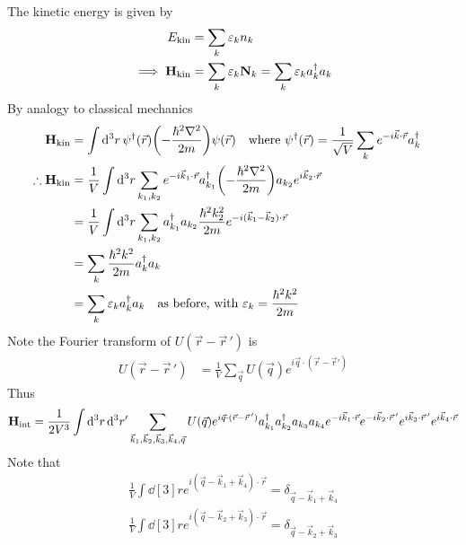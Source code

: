 \documentclass[12pt,a4paper,titlepage]{article}
\newcommand{\trm}[1]{\textrm{#1}} %
\begin{document}
The kinetic energy is given by
\begin{equation}
\begin{aligned}
E_{\trm{kin}}&=\sum_{k}\varepsilon_{k}n_{k}\\
\implies \vb{H}_{\trm{kin}}&=\sum_{k}\varepsilon_{k}\vb{N}_{k}=\sum_{k}\varepsilon_{k}a_{k}^{\dagger}a_{k}
\end{aligned}
\end{equation}
By analogy to classical mechanics
\begin{equation}
\begin{aligned}
\vb{H}_{\trm{kin}}&=\int\dd[3]{r}\psi^{\dagger}(\vec{r})\qty(-\frac{\hbar^{2}\nabla^{2}}{2m})\psi(\vec{r})\qq{where $\psi^{\dagger}(\vec{r})=\frac{1}{\sqrt{V}}\sum_{k}e^{-i\vec{k}\cdot\vec{r}}a_{k}^{\dagger}$}\\
\therefore \vb{H}_{\trm{kin}}&=\frac{1}{V}\int\dd[3]{r}\sum_{k_{1},k_{2}}e^{-i\vec{k}_{1}\cdot\vec{r}}a_{k_{1}}^{\dagger}\qty(-\frac{\hbar^{2}\nabla^{2}}{2m})a_{k_{2}}e^{i\vec{k}_{2}\cdot\vec{r}}\\
&=\frac{1}{V}\int\dd[3]{r}\sum_{k_{1},k_{2}}a_{k_{1}}^{\dagger}a_{k_{2}}\frac{\hbar^{2}k_{2}^{2}}{2m}e^{-i(\vec{k}_{1}-\vec{k}_{2})\cdot\vec{r}}\\
&=\sum_{k}\frac{\hbar^{2}k^{2}}{2m}a_{k}^{\dagger}a_{k}\\
&=\sum_{k}\varepsilon_{k}a_{k}^{\dagger}a_{k}\qq{as before, with $\varepsilon_{k}=\frac{\hbar^{2}k^{2}}{2m}$}
\end{aligned}
\end{equation}
Note the Fourier transform of $U(\vec{r}-\vec{r}\,')$ is
\begin{equation}
\begin{aligned}
U(\vec{r}-\vec{r}\,')&=\frac{1}{V}\sum_{\vec{q}}U(\vec{q})e^{i\vec{q}\cdot(\vec{r}-\vec{r}')}
\end{aligned}
\end{equation}
Thus
\begin{equation}
\vb{H}_{\trm{int}}=\frac{1}{2V^{3}}\int\dd[3]{r}\dd[3]{r'}\sum_{\vec{k}_{1},\vec{k}_{2},\vec{k}_{3},\vec{k}_{4},\vec{q}}U(\vec{q})e^{i\vec{q}\cdot(\vec{r}-\vec{r}\,')}a_{k_{1}}^{\dagger}a_{k_{2}}^{\dagger}a_{k_{3}}a_{k_{4}}e^{-i\vec{k}_{1}\cdot\vec{r}}e^{-i\vec{k}_{2}\cdot\vec{r}\,'}e^{i\vec{k}_{3}\cdot\vec{r}\,'}e^{i\vec{k}_{4}\cdot\vec{r}}
\end{equation}
Note that
\begin{equation}
\begin{aligned}
\frac{1}{V}\int\dd[3]{r}e^{i(\vec{q}-\vec{k}_{1}+\vec{k}_{4})\cdot\vec{r}}=\delta_{\vec{q}-\vec{k}_{1}+\vec{k}_{4}}\\
\frac{1}{V}\int\dd[3]{r}e^{i(\vec{q}-\vec{k}_{2}+\vec{k}_{3})\cdot\vec{r}}=\delta_{\vec{q}-\vec{k}_{2}+\vec{k}_{3}}
\end{aligned}
\end{equation}
\end{document}
